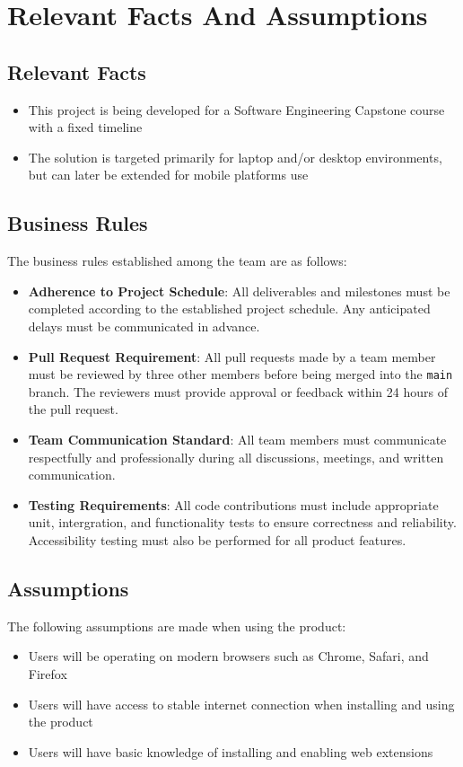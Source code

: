 \documentclass[12pt]{article}
\begin{document}
\section{Relevant Facts And Assumptions}
\subsection{Relevant Facts}
\begin{itemize}
  \item This project is being developed for a Software Engineering Capstone course with a fixed timeline
  \item The solution is targeted primarily for laptop and/or desktop environments, but can later be extended for mobile platforms use
\end{itemize}
\subsection{Business Rules}
The business rules established among the team are as follows: 
\begin{itemize}
  \item \textbf{Adherence to Project Schedule}: All deliverables and milestones must be 
  completed according to the established project schedule. Any anticipated delays must be communicated
  in advance.
  \item \textbf{Pull Request Requirement}: All pull requests made by a team member must be reviewed by 
  three other members before being merged into the \texttt{main} branch. The reviewers must provide approval
  or feedback within 24 hours of the pull request.
  \item \textbf{Team Communication Standard}: All team members must communicate respectfully and professionally during 
  all discussions, meetings, and written communication. 
  \item \textbf{Testing Requirements}: All code contributions must include appropriate unit, intergration, and 
  functionality tests to ensure correctness and reliability. Accessibility testing must also be performed for all
  product features. 
\end{itemize}
\subsection{Assumptions}
The following assumptions are made when using the product:
\begin{itemize}
  \item Users will be operating on modern browsers such as Chrome, Safari, and Firefox
  \item Users will have access to stable internet connection when installing and using the product
  \item Users will have basic knowledge of installing and enabling web extensions
\end{itemize}
\end{document}
